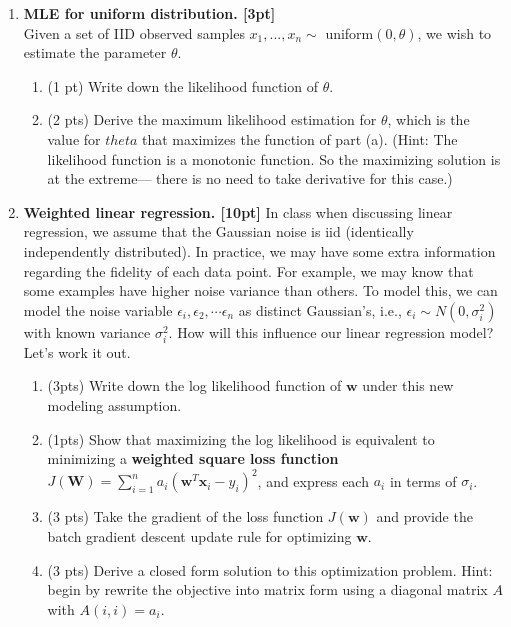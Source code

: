\documentclass{article}
\begin{document}
\begin{enumerate}
\item \textbf{MLE for uniform distribution. [3pt]} \\
Given a set of IID observed samples $x_1,...,x_n\sim$ uniform$(0,\theta)$, we wish to estimate the parameter $\theta$.
\begin{enumerate}
\item (1 pt) Write down the likelihood function of $\theta$.\\
 \item (2 pts) Derive the maximum likelihood estimation for $\theta$, which is the value for $theta$ that maximizes the function of part (a). (Hint: The likelihood function is a monotonic function. So the maximizing solution is at the extreme--- there is no need to take derivative for this case.)\\
\end{enumerate}

\item \textbf{Weighted linear regression. [10pt]}  In class when discussing linear regression, we assume that the Gaussian noise is iid (identically independently distributed). In practice, we may have some extra information regarding the fidelity of each data point. For example, we may know that some examples have higher noise variance than others. To model this, we can model the noise variable $\epsilon_i, \epsilon_2, \cdots \epsilon_n$ as distinct Gaussian's, i.e., $\epsilon_i \sim N(0, \sigma_i^2)$ with known variance $\sigma_i^2$. How will this influence our linear regression model? Let's work it out.

 \begin{enumerate}
    \item (3pts) Write down the log likelihood function of $\mathbf{w}$ under this new modeling assumption.\\

    \item (1pts) Show that maximizing the log likelihood is equivalent to minimizing a \textbf{weighted square loss function} $J(\mathbf{W}) = \sum_{i=1}^na_i(\mathbf{w}^T\mathbf{x}_i-y_i)^2$, and express each $a_i$ in terms of $\sigma_i$.\\
    \item (3 pts) Take the gradient of the loss function $J(\mathbf{w})$ and provide the batch gradient descent update rule for optimizing $\mathbf{w}$.\\
    \item (3 pts) Derive a closed form solution to this optimization problem. Hint: begin by rewrite the objective into matrix form using a diagonal matrix $A$ with $A(i,i)=a_i$.\\


\end{enumerate}
\end{enumerate}
\end{document}
